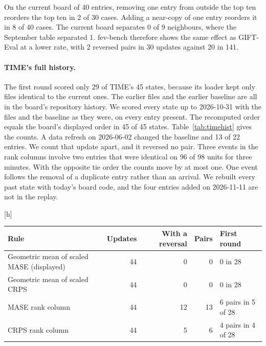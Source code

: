 \documentclass{article}
\makeatletter
\renewenvironment{table}
  {\setlength{\abovecaptionskip}{6\p@}%
   \setlength{\belowcaptionskip}{\z@}%
   \@float{table}}
  {\end@float}
\makeatother
\begin{document}
On the current board of 40 entries, removing one entry from outside the top ten reorders the
top ten in 2 of 30 cases. Adding a near-copy of one entry reorders it in 8 of 40 cases. The
current board separates 0 of 9 neighbours, where the September table separated 1. fev-bench
therefore shows the same effect as GIFT-Eval at a lower rate, with 2 reversed pairs in 30
updates against 20 in 141.

\paragraph{TIME's full history.} The first round scored only 29 of TIME's 45 states, because
its loader kept only files identical to the current ones. The earlier files and the earlier
baseline are all in the board's repository history. We scored every state up to 2026-10-31
with the files and the baseline as they were, on every entry present. The recomputed order
equals the board's displayed order in 45 of 45 states. Table~\ref{tab:timehist} gives the
counts. A data refresh on 2026-06-02 changed the baseline and 13 of 22 entries. We count that
update apart, and it reversed no pair. Three events in the rank columns involve two entries
that were identical on 96 of 98 units for three minutes. With the opposite tie order the
counts move by at most one. One event follows the removal of a duplicate entry rather than an
arrival. We rebuilt every past state with today's board code, and the four entries added on
2026-11-11 are not in the replay.

\begin{table}[h]
\centering
\small
\begin{tabular}{@{}lrrrl@{}}
\toprule
\textbf{Rule} & \textbf{Updates} & \textbf{With a reversal} & \textbf{Pairs} & \textbf{First round} \\
\midrule
Geometric mean of scaled MASE (displayed) & 44 & 0 & 0 & 0 in 28 \\
Geometric mean of scaled CRPS & 44 & 0 & 0 & 0 in 28 \\
MASE rank column & 44 & 12 & 13 & 6 pairs in 5 of 28 \\
CRPS rank column & 44 & 5 & 6 & 4 pairs in 4 of 28 \\
\bottomrule
\end{tabular}
\caption{Untouched top-ten pairs reversed on TIME, replayed over its whole history on the pool
the board showed. The last column gives the first round's count on a smaller pool and fewer
updates.}
\label{tab:timehist}
\end{table}
\end{document}
